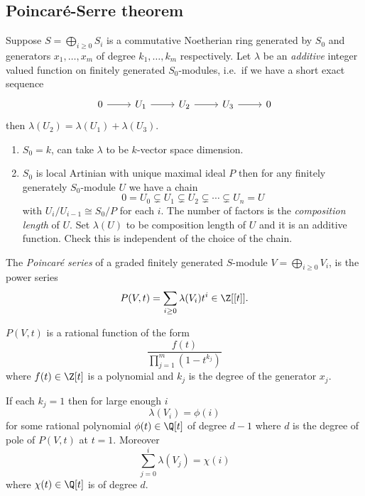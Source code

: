 \documentclass[a4paper]{article}
\begin{document}
\subsection{Poincaré-Serre theorem}

Suppose \(S = \bigoplus_{i \geq 0} S_i\) is a commutative Noetherian ring generated by \(S_0\) and generators \(x_1, \dots, x_m\) of degree \(k_1, \dots, k_m\) respectively. Let \(\lambda\) be an \emph{additive} integer valued function on finitely generated \(S_0\)-modules, i.e.\ if we have a short exact sequence
\[
  \begin{tikzcd}
    0 \ar[r] & U_1 \ar[r] & U_2 \ar[r] & U_3 \ar[r] & 0
  \end{tikzcd}
\]
then \(\lambda(U_2) = \lambda(U_1) + \lambda(U_3)\).

\begin{eg}\leavevmode
  \begin{enumerate}
  \item \(S_0 = k\), can take \(\lambda\) to be \(k\)-vector space dimension.
  \item \(S_0\) is local Artinian with unique maximal ideal \(P\) then for any finitely generately \(S_0\)-module \(U\) we have a chain
    \[
      0 = U_0 \subsetneq U_1 \subsetneq U_2 \subsetneq \cdots \subsetneq U_n = U
    \]
    with \(U_i/U_{i - 1} \cong S_0/P\) for each \(i\). The number of factors is the \emph{composition length} of \(U\). Set \(\lambda(U)\) to be composition length of \(U\) and it is an additive function. Check this is independent of the choice of the chain.
  \end{enumerate}
\end{eg}

\begin{definition}
  The \emph{Poincaré series} of a graded finitely generated \(S\)-module \(V = \bigoplus_{i \geq 0} V_i\), is the power series
  \[
    P(V, t) = \sum_{i \geq 0} \lambda(V_i) t^i \in \Z[[t]].
  \]
\end{definition}

\begin{theorem}
  \label{thm:Hilbert-Serre}
  \(P(V, t)\) is a rational function of the form
  \[
    \frac{f(t)}{\prod_{j =1}^m (1 - t^{k_j})}
  \]
  where \(f(t) \in \Z[t]\) is a polynomial and \(k_j\) is the degree of the generator \(x_j\).
\end{theorem}

\begin{corollary}
  \label{cor:corollary of Hilbert-Serre}
  If each \(k_j = 1\) then for large enough \(i\)
  \[
    \lambda(V_i) = \phi(i)
  \]
  for some rational polynomial \(\phi(t) \in \Q[t]\) of degree \(d - 1\) where \(d\) is the degree of pole of \(P(V, t)\) at \(t = 1\). Moreover
  \[
    \sum_{j = 0}^i \lambda(V_j) = \chi(i)
  \]
  where \(\chi(t) \in \Q[t]\) is of degree \(d\).
\end{corollary}
\end{document}
